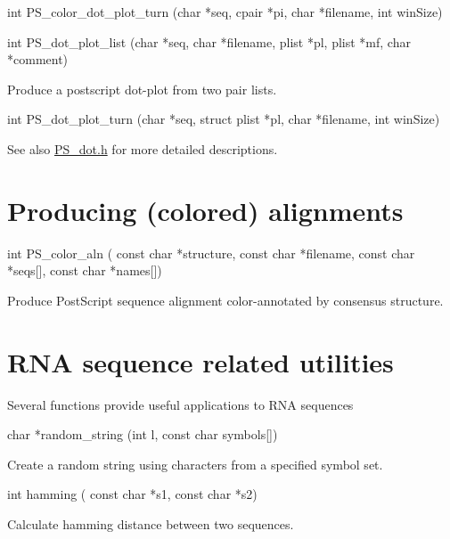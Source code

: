 \begin{DoxyVerb}int PS_color_dot_plot_turn (char *seq,
                            cpair *pi,
                            char *filename,
                            int winSize)
\end{DoxyVerb}


\begin{DoxyVerb}int PS_dot_plot_list (char *seq,
                      char *filename,
                      plist *pl,
                      plist *mf,
                      char *comment)
\end{DoxyVerb}
 Produce a postscript dot-\/plot from two pair lists.

\begin{DoxyVerb}int PS_dot_plot_turn (char *seq,
                      struct plist *pl,
                      char *filename,
                      int winSize)
\end{DoxyVerb}


\begin{DoxySeeAlso}{See also}
\hyperlink{PS__dot_8h}{P\+S\+\_\+dot.\+h} for more detailed descriptions.
\end{DoxySeeAlso}
\hypertarget{mp_utils_utils_aln}{}\section{Producing (colored) alignments}\label{mp_utils_utils_aln}
\begin{DoxyVerb}int PS_color_aln (
            const char *structure,
            const char *filename,
            const char *seqs[],
            const char *names[])
\end{DoxyVerb}
 Produce Post\+Script sequence alignment color-\/annotated by consensus structure.

\hypertarget{mp_utils_utils_seq}{}\section{R\+N\+A sequence related utilities}\label{mp_utils_utils_seq}
Several functions provide useful applications to R\+NA sequences

\begin{DoxyVerb}char  *random_string (int l,
                      const char symbols[])
\end{DoxyVerb}
 Create a random string using characters from a specified symbol set.

\begin{DoxyVerb}int   hamming ( const char *s1,
                const char *s2)
\end{DoxyVerb}
 Calculate hamming distance between two sequences.

